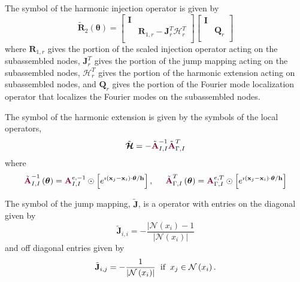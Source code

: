 \begin{definition}
The symbol of the harmonic injection operator is given by
\begin{equation}
\tilde{\mathbf{R}}_2 \left( \boldsymbol{\theta} \right) =
\begin{bmatrix}
\mathbf{I} &                                                                  \\
           & \mathbf{R}_{1, r} - \mathbf{J}^T_r \boldsymbol{\mathcal{H}}^T_r  \\
\end{bmatrix}
\begin{bmatrix}
\mathbf{I} &                 \\
           & \mathbf{Q}_{r}  \\
\end{bmatrix}
\end{equation}
where $\mathbf{R}_{1, r}$ gives the portion of the scaled injection operator acting on the subassembled nodes, $\mathbf{J}^T_r$ gives the portion of the jump mapping acting on the subassembled nodes, $\boldsymbol{\mathcal{H}}^T_r$ gives the portion of the harmonic extension acting on subassembled nodes, and $\mathbf{Q}_r$ gives the portion of the Fourier mode localization operator that localizes the Fourier modes on the subassembled nodes.

The symbol of the harmonic extension is given by the symbols of the local operators,
\begin{equation}
\tilde{\boldsymbol{\mathcal{H}}} = - \tilde{{\color{burgundy}\mathbf{A}}}_{I, I}^{-1} \tilde{{\color{burgundy}\mathbf{A}}}_{\Gamma, I}^T
\end{equation}
where
\begin{equation}
\tilde{{\color{burgundy}\mathbf{A}}}_{I, I}^{-1} \left( \boldsymbol{\theta} \right) = {\color{burgundy}\mathbf{A}}_{I, I}^{e, -1} \odot \left[ e^{\imath \left( \mathbf{x}_j - \mathbf{x}_i \right) \cdot \boldsymbol{\theta} / \mathbf{h}} \right],
\hspace{5mm}
\tilde{{\color{burgundy}\mathbf{A}}}_{\Gamma, I}^T \left( \boldsymbol{\theta} \right) = {\color{burgundy}\mathbf{A}}_{\Gamma, I}^{e, T} \odot \left[ e^{\imath \left( \mathbf{x}_j - \mathbf{x}_i \right) \cdot \boldsymbol{\theta} / \mathbf{h}} \right]
\end{equation}

The symbol of the jump mapping, $\tilde{\mathbf{J}}$, is a operator with entries on the diagonal given by
\begin{equation}
\tilde{\mathbf{J}}_{i, i} = - \frac{\lvert \mathcal{N} \left( x_i \right) - 1}{\lvert \mathcal{N} \left( x_i \right) \rvert}
\end{equation}
and off diagonal entries given by
\begin{equation}
\tilde{\mathbf{J}}_{i, j} = - \frac{1}{\lvert \mathcal{N} \left( x_i \right) \rvert} \hspace{2mm} \text{if} \hspace{2mm} x_j \in \mathcal{N} \left( x_i \right).
\end{equation}
\label{def:harmonic_injection_symbol}
\end{definition}
